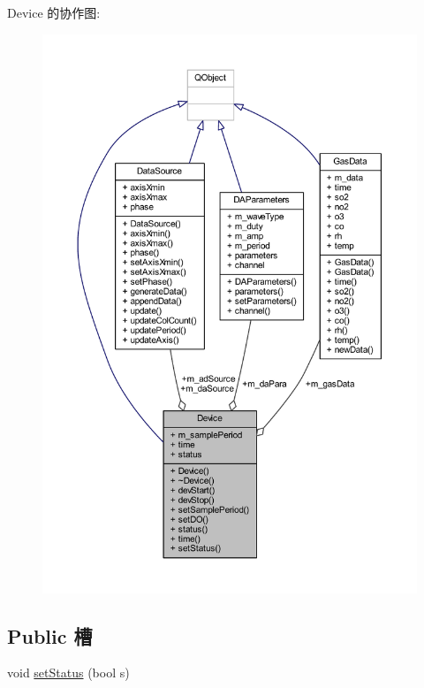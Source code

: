 Device 的协作图\+:
\nopagebreak
\begin{figure}[H]
\begin{center}
\leavevmode
\includegraphics[width=350pt]{class_device__coll__graph}
\end{center}
\end{figure}
\subsection*{Public 槽}
\begin{DoxyCompactItemize}
\item 
void \hyperlink{class_device_a1466fe821dfd974399b09829a1a6ddc5}{set\+Status} (bool s)
\end{DoxyCompactItemize}
